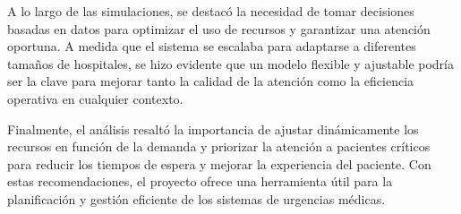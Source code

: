 \documentclass[12pt]{article}
\begin{document}
A lo largo de las simulaciones, se destacó la necesidad de tomar decisiones basadas en datos para optimizar el uso de recursos y garantizar una atención oportuna. A medida que el sistema se escalaba para adaptarse a diferentes tamaños de hospitales, se hizo evidente que un modelo flexible y ajustable podría ser la clave para mejorar tanto la calidad de la atención como la eficiencia operativa en cualquier contexto.

Finalmente, el análisis resaltó la importancia de ajustar dinámicamente los recursos en función de la demanda y priorizar la atención a pacientes críticos para reducir los tiempos de espera y mejorar la experiencia del paciente. Con estas recomendaciones, el proyecto ofrece una herramienta útil para la planificación y gestión eficiente de los sistemas de urgencias médicas.
\end{document}
